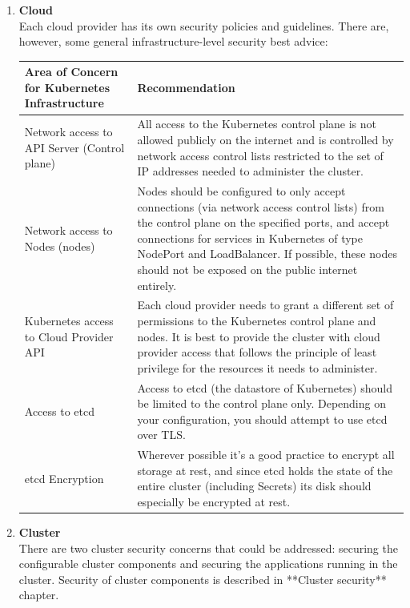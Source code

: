 \begin{enumerate}

\item \textbf{Cloud} \\
Each cloud provider has its own security policies and guidelines. There are, however, some general infrastructure-level security best advice:

\begin{center}
    \begin{tabular}{ | m{16em} | m{16em} | } 
     \hline
     \textbf{Area of Concern for Kubernetes Infrastructure} & \textbf{Recommendation} \\ 
     \hline
     Network access to API Server (Control plane) & All access to the Kubernetes control plane is not allowed publicly on the internet and is controlled by network access control lists restricted to the set of IP addresses needed to administer the cluster. \\ 
     \hline
     Network access to Nodes (nodes)  & Nodes should be configured to only accept connections (via network access control lists) from the control plane on the specified ports, and accept connections for services in Kubernetes of type NodePort and LoadBalancer. If possible, these nodes should not be exposed on the public internet entirely. \\ 
     \hline
     Kubernetes access to Cloud Provider API & Each cloud provider needs to grant a different set of permissions to the Kubernetes control plane and nodes. It is best to provide the cluster with cloud provider access that follows the principle of least privilege for the resources it needs to administer. \\
     \hline
     Access to etcd & Access to etcd (the datastore of Kubernetes) should be limited to the control plane only. Depending on your configuration, you should attempt to use etcd over TLS. \\
     \hline
     etcd Encryption & Wherever possible it's a good practice to encrypt all storage at rest, and since etcd holds the state of the entire cluster (including Secrets) its disk should especially be encrypted at rest. \\
     \hline
    \end{tabular}
\end{center}

\item \textbf{Cluster} \\
There are two cluster security concerns that could be addressed: securing the configurable cluster components and securing the applications running in the cluster. Security of cluster components is described in **Cluster security** chapter.


\end{enumerate}
